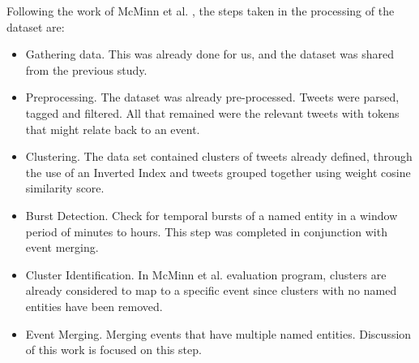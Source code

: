 \documentclass[a4paper,portrait,12pt]{article}
\begin{document}
Following the work of McMinn et al. \cite{McMinn2013}, the steps taken in the processing of the dataset are:
\begin{itemize}
	\item Gathering data. This was already done for us, and the dataset was shared from the previous study.
	\item Preprocessing. The dataset was already pre-processed. Tweets were parsed, tagged and filtered. All that remained were the relevant tweets with tokens that might relate back to an event.
	\item Clustering. The data set contained clusters of tweets already defined, through the use of an Inverted Index and tweets grouped together using weight cosine similarity score.
	\item Burst Detection. Check for temporal bursts of a named entity in a window period of minutes to hours. This step was completed in conjunction with event merging.
	\item Cluster Identification. In McMinn et al. \cite{McMinn2013} evaluation program, clusters are already considered to map to a specific event since clusters with no named entities have been removed.
	\item Event Merging. Merging events that have multiple named entities. Discussion of this work is focused on this step.
\end{itemize}
\end{document}

